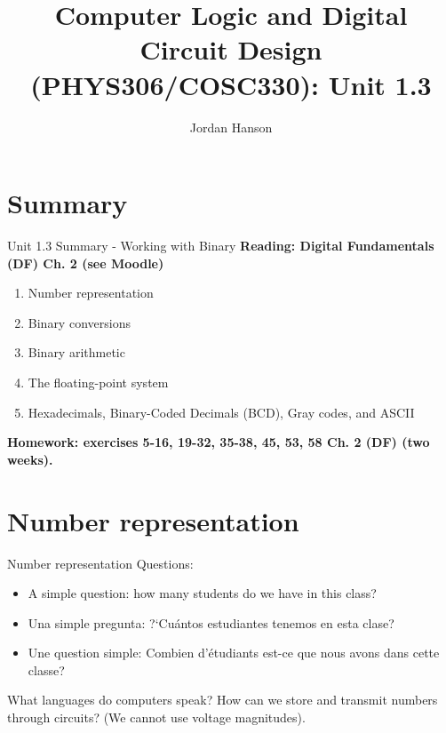 \documentclass{beamer}
\title{Computer Logic and Digital Circuit Design (PHYS306/COSC330): Unit 1.3}
\author{Jordan Hanson}
\institute{Whittier College Department of Physics and Astronomy}
\begin{document}
\maketitle

\section{Summary}

\begin{frame}{Unit 1.3 Summary - Working with Binary}
\textbf{Reading: Digital Fundamentals (DF) Ch. 2 (see Moodle)}
\begin{enumerate}
\item Number representation
\item Binary conversions
\item Binary arithmetic
\item The floating-point system
\item Hexadecimals, Binary-Coded Decimals (BCD), Gray codes, and ASCII
\end{enumerate}
\textbf{Homework: exercises 5-16, 19-32, 35-38, 45, 53, 58 Ch. 2 (DF) (two weeks).}
\end{frame}

\section{Number representation}

\begin{frame}{Number representation}
Questions:
\begin{itemize}
\item A simple question: how many students do we have in this class? \\
\item Una simple pregunta: ?`Cu\'{a}ntos estudiantes tenemos en esta clase? \\
\item Une question simple: Combien d'\'{e}tudiants est-ce que nous avons dans cette classe?
\end{itemize}
What languages do computers speak?  How can we store and transmit numbers through circuits?  (We cannot use voltage magnitudes).
\end{frame}
\end{document}

